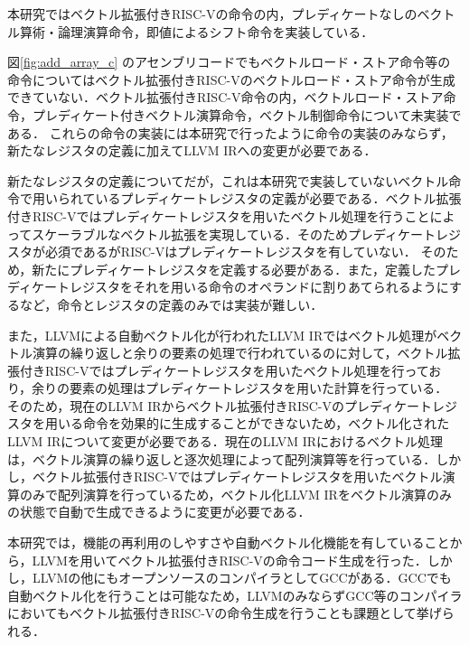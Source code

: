 
本研究ではベクトル拡張付きRISC-Vの命令の内，プレディケートなしのベクトル算術・論理演算命令，即値によるシフト命令を実装している．

図\ref{fig:add_array_c}
のアセンブリコードでもベクトルロード・ストア命令等の命令についてはベクトル拡張付きRISC-Vのベクトルロード・ストア命令が生成できていない．ベクトル拡張付きRISC-V命令の内，ベクトルロード・ストア命令，プレディケート付きベクトル演算命令，ベクトル制御命令について未実装である．
これらの命令の実装には本研究で行ったように命令の実装のみならず，新たなレジスタの定義に加えてLLVM IRへの変更が必要である．

新たなレジスタの定義についてだが，これは本研究で実装していないベクトル命令で用いられているプレディケートレジスタの定義が必要である．ベクトル拡張付きRISC-Vではプレディケートレジスタを用いたベクトル処理を行うことによってスケーラブルなベクトル拡張を実現している．そのためプレディケートレジスタが必須であるがRISC-Vはプレディケートレジスタを有していない．
そのため，新たにプレディケートレジスタを定義する必要がある．また，定義したプレディケートレジスタをそれを用いる命令のオペランドに割りあてられるようにするなど，命令とレジスタの定義のみでは実装が難しい．

また，LLVMによる自動ベクトル化が行われたLLVM IRではベクトル処理がベクトル演算の繰り返しと余りの要素の処理で行われているのに対して，ベクトル拡張付きRISC-Vではプレディケートレジスタを用いたベクトル処理を行っており，余りの要素の処理はプレディケートレジスタを用いた計算を行っている．
そのため，現在のLLVM IRからベクトル拡張付きRISC-Vのプレディケートレジスタを用いる命令を効果的に生成することができないため，ベクトル化されたLLVM IRについて変更が必要である．現在のLLVM IRにおけるベクトル処理は，ベクトル演算の繰り返しと逐次処理によって配列演算等を行っている．しかし，ベクトル拡張付きRISC-Vではプレディケートレジスタを用いたベクトル演算のみで配列演算を行っているため，ベクトル化LLVM IRをベクトル演算のみの状態で自動で生成できるように変更が必要である．

本研究では，機能の再利用のしやすさや自動ベクトル化機能を有していることから，LLVMを用いてベクトル拡張付きRISC-Vの命令コード生成を行った．しかし，LLVMの他にもオープンソースのコンパイラとしてGCCがある．GCCでも自動ベクトル化を行うことは可能なため，LLVMのみならずGCC等のコンパイラにおいてもベクトル拡張付きRISC-Vの命令生成を行うことも課題として挙げられる．